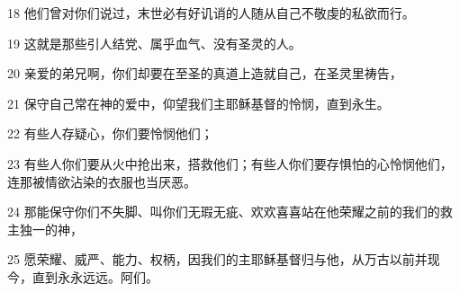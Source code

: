 \par 18 他们曾对你们说过，末世必有好讥诮的人随从自己不敬虔的私欲而行。
\par 19 这就是那些引人结党、属乎血气、没有圣灵的人。
\par 20 亲爱的弟兄啊，你们却要在至圣的真道上造就自己，在圣灵里祷告，
\par 21 保守自己常在神的爱中，仰望我们主耶稣基督的怜悯，直到永生。
\par 22 有些人存疑心，你们要怜悯他们；
\par 23 有些人你们要从火中抢出来，搭救他们；有些人你们要存惧怕的心怜悯他们，连那被情欲沾染的衣服也当厌恶。
\par 24 那能保守你们不失脚、叫你们无瑕无疵、欢欢喜喜站在他荣耀之前的我们的救主独一的神，
\par 25 愿荣耀、威严、能力、权柄，因我们的主耶稣基督归与他，从万古以前并现今，直到永永远远。阿们。


